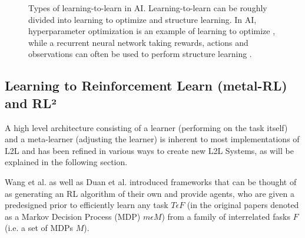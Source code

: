 \documentclass[letterpaper, 10 pt, conference]{ieeeconf}  %
\begin{document}
\begin{figure}[thpb]
        \centering
  \caption{Types of learning-to-learn in AI. Learning-to-learn can be roughly divided into learning to optimize and structure learning.
  In AI, hyperparameter optimization is
  an example of learning to optimize \cite{maclaurinGradientbasedHyperparameterOptimization}, while a 
  recurrent neural network taking rewards, actions and observations
   can often be used to perform structure learning \cite{wangLearningReinforcementLearn2016} \cite{lansdellLearningtolearn2018}.}
        \label{figurelabel}
     \end{figure}


\subsection{Learning to Reinforcement Learn (metal-RL) and RL²}

A high level architecture consisting of a learner (performing on the task itself) and a meta-learner (adjusting the learner) is
inherent to most implementations of L2L \cite{lansdellLearningtolearn2018} and has been refined in various ways to create new L2L Systems, as will be
explained in the following section.

Wang et al.\cite{wangLearningReinforcementLearn2016} as well as Duan et al.\cite{duanRLFastReinforcement2016} introduced 
frameworks that can be thought of as generating an RL algorithm of their own and
provide agents, who are given a predesigned prior to efficiently learn any task $T \epsilon F$ (in the original papers denoted as 
a Markov Decision Process (MDP) $m \epsilon M$) from a family of interrelated fasks $F$(i.e. a set of MDPs $M$). 
\end{document}
